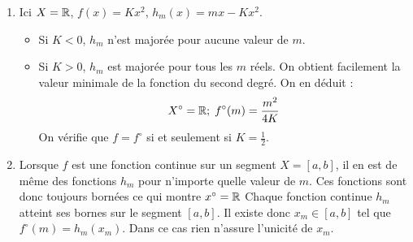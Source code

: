 \begin{enumerate}
\item Ici $X=\mathbb{R}$, $f(x)=Kx^{2}$, $h_m(x)=mx-Kx^2$.
\begin{itemize}
 \item Si $K<0$, $h_m$ n'est majorée pour aucune valeur de $m$.
 \item Si $K>0$, $h_m$ est majorée pour tous les $m$ réels. On obtient facilement la valeur minimale de la fonction du second degré. On en déduit :
\begin{displaymath}
 X^\circ =\mathbb{R} ;\; f^\circ (m)=\dfrac{m^2}{4K}
\end{displaymath}
On vérifie que $f=f^\circ$ si et seulement si $K=\frac{1}{2}$.
\end{itemize}


\item  Lorsque $f$ est une fonction continue sur un segment $X=\left[
a,b\right] $, il en est de m\^{e}me des fonctions $h_{m}$ pour n'importe
quelle valeur de $m$. Ces fonctions sont donc toujours born\'{e}es ce qui
montre $x^\circ =\mathbb{R}$ \newline
 Chaque fonction continue $h_{m}$ atteint ses bornes sur le segment $
\left[ a,b\right] $. Il existe donc $x_{m}\in \left[ a,b\right] $ tel que $
f^{\circ }(m)=h_{m}(x_{m})$. Dans ce cas rien n'assure l'unicité de $x_m$.



\end{enumerate}
